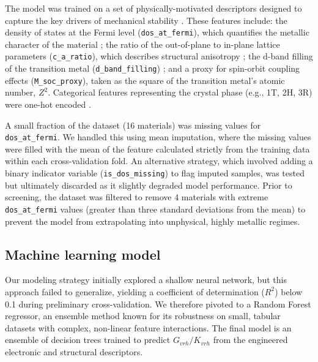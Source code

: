 \documentclass[]{article}
\begin{document}
The model was trained on a set of physically-motivated descriptors designed to capture the key drivers of mechanical stability \citep{Pham_2018,tawfik2022naturallymeaningfulefficientdescriptorsmachine,Tawfik_2022,Gajera_2022,Willatt_2018,Mukhamedov_2025,Hasan_2025,Liu_2024}. These features include: the density of states at the Fermi level (\texttt{dos\_at\_fermi}), which quantifies the metallic character of the material \citep{Georgescu_2021}; the ratio of the out-of-plane to in-plane lattice parameters (\texttt{c\_a\_ratio}), which describes structural anisotropy \citep{singh2025linkingquantummechanicalfeatures,Hasan_2025,Liu_2024}; the d-band filling of the transition metal (\texttt{d\_band\_filling}) \citep{Pham_2018,Gajera_2022,Willatt_2018}; and a proxy for spin-orbit coupling effects (\texttt{M\_soc\_proxy}), taken as the square of the transition metal's atomic number, $Z^2$. Categorical features representing the crystal phase (e.g., 1T, 2H, 3R) were one-hot encoded \citep{singh2025linkingquantummechanicalfeatures,Hasan_2025,mizzi2026leveragingmechanicalresonancesselection}.

A small fraction of the dataset (16 materials) was missing values for \texttt{dos\_at\_fermi}. We handled this using mean imputation, where the missing values were filled with the mean of the feature calculated strictly from the training data within each cross-validation fold. An alternative strategy, which involved adding a binary indicator variable (\texttt{is\_dos\_missing}) to flag imputed samples, was tested but ultimately discarded as it slightly degraded model performance. Prior to screening, the dataset was filtered to remove 4 materials with extreme \texttt{dos\_at\_fermi} values (greater than three standard deviations from the mean) to prevent the model from extrapolating into unphysical, highly metallic regimes.

\subsection{Machine learning model}
Our modeling strategy initially explored a shallow neural network, but this approach failed to generalize, yielding a coefficient of determination ($R^2$) below 0.1 during preliminary cross-validation. We therefore pivoted to a Random Forest regressor, an ensemble method known for its robustness on small, tabular datasets with complex, non-linear feature interactions. The final model is an ensemble of decision trees trained to predict $G_{vrh}/K_{vrh}$ from the engineered electronic and structural descriptors.
\end{document}

